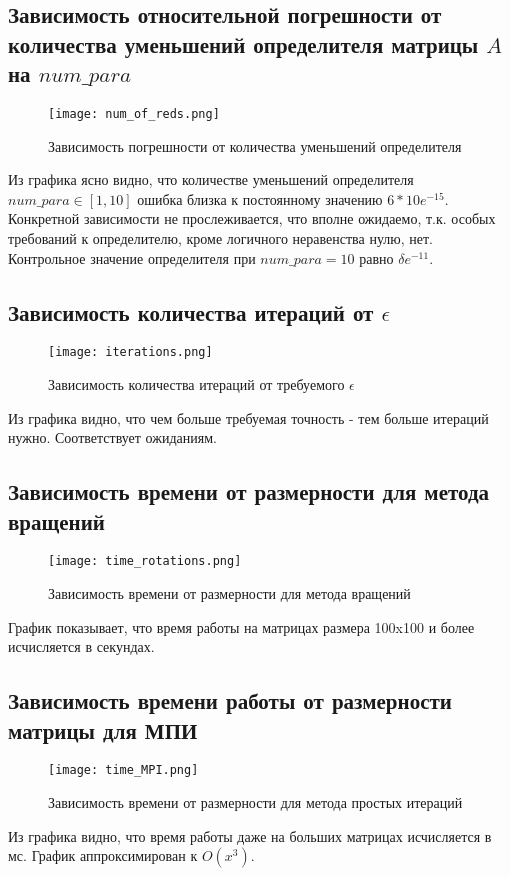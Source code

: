 \documentclass[12pt]{article}
\begin{document}
\subsection{Зависимость относительной погрешности от количества уменьшений определителя матрицы $A$ на $num\_para$}
\begin{figure}[h!]
\center
\texttt{[image: num\_of\_reds.png]}
\caption{Зависимость погрешности от количества уменьшений определителя}
\label{error_cond}
\end{figure}
\newpage
Из графика ясно видно, что количестве уменьшений определителя $ num\_para \in [1,10]$ ошибка близка к постоянному значению $6 * 10e^{-15}$.\\
Конкретной зависимости не прослеживается, что вполне ожидаемо, т.к. особых требований к определителю, кроме логичного неравенства нулю, нет.\\
Контрольное значение определителя при $num\_para = 10 $ равно $\delta e^{-11}$.
\subsection{Зависимость количества итераций от $\epsilon$}
\begin{figure}[h!]
\center
\texttt{[image: iterations.png]}
\caption{Зависимость количества итераций от требуемого $\epsilon$}
\label{error_cond}
\end{figure}
Из графика видно, что чем больше требуемая точность - тем больше итераций нужно. Соответствует ожиданиям.\\
\newpage
\subsection{Зависимость времени от размерности для метода вращений}
\begin{figure}[h!]
\texttt{[image: time\_rotations.png]}
\caption{Зависимость времени от размерности для метода вращений}
\label{error_errorData}
\end{figure}
График показывает, что время работы на матрицах размера 100x100 и более исчисляется в секундах.\\
\newpage
\subsection{Зависимость времени работы от размерности матрицы для МПИ}
\begin{figure}[h!]
\texttt{[image: time\_MPI.png]}
\caption{Зависимость времени от размерности для метода простых итераций}
\label{error_errorData}
\end{figure}
Из графика видно, что время работы даже на больших матрицах исчисляется в мс. График аппроксимирован к $O(x^3)$.
\newpage
\end{document}
